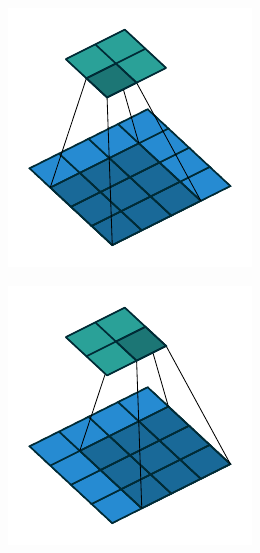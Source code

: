 \begin{figure}[tbp!]
\begin{subfigure}[b]{0.24\textwidth}
        \caption{}
        \label{fig: Neural networks: no_padding_no_strides_01}
    \end{subfigure}
    \hfill
    \begin{subfigure}[b]{0.24\textwidth}
        \centering
        \includegraphics[width=\textwidth]{graphics/neuralnetworks/no_padding_no_strides_02.pdf}
        \caption{}
        \label{fig: Neural networks: no_padding_no_strides_02}
    \end{subfigure}
    \hfill
    \begin{subfigure}[b]{0.24\textwidth}
        \centering
        \includegraphics[width=\textwidth]{graphics/neuralnetworks/no_padding_no_strides_03.pdf}

\end{subfigure}
\end{figure}
